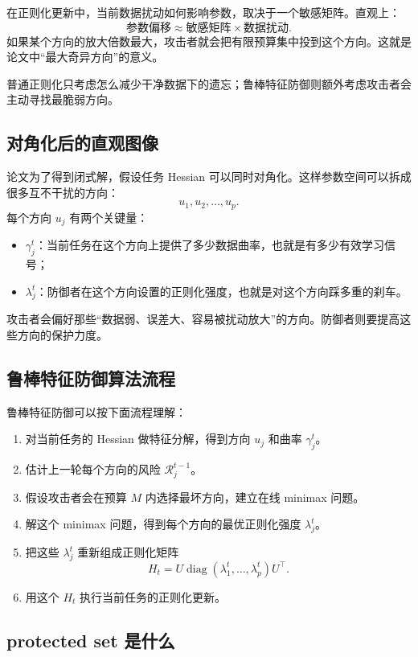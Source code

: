 \documentclass[UTF8,fontset=none,11pt]{ctexart}
\newcommand{\calR}{\mathcal{R}}
\newcommand{\diag}{\operatorname{diag}}
\begin{document}
在正则化更新中，当前数据扰动如何影响参数，取决于一个敏感矩阵。直观上：
\[
  \text{参数偏移}
  \approx
  \text{敏感矩阵}\times\text{数据扰动}.
\]
如果某个方向的放大倍数最大，攻击者就会把有限预算集中投到这个方向。这就是论文中“最大奇异方向”的意义。

普通正则化只考虑怎么减少干净数据下的遗忘；鲁棒特征防御则额外考虑攻击者会主动寻找最脆弱方向。

\subsection{对角化后的直观图像}

论文为了得到闭式解，假设任务 Hessian 可以同时对角化。这样参数空间可以拆成很多互不干扰的方向：
\[
  u_1,u_2,\dots,u_p.
\]
每个方向 \(u_j\) 有两个关键量：
\begin{itemize}
  \item \(\gamma_j^t\)：当前任务在这个方向上提供了多少数据曲率，也就是有多少有效学习信号；
  \item \(\lambda_j^t\)：防御者在这个方向设置的正则化强度，也就是对这个方向踩多重的刹车。
\end{itemize}

攻击者会偏好那些“数据弱、误差大、容易被扰动放大”的方向。防御者则要提高这些方向的保护力度。

\subsection{鲁棒特征防御算法流程}

鲁棒特征防御可以按下面流程理解：

\begin{enumerate}
  \item 对当前任务的 Hessian 做特征分解，得到方向 \(u_j\) 和曲率 \(\gamma_j^t\)。
  \item 估计上一轮每个方向的风险 \(\calR_j^{t-1}\)。
  \item 假设攻击者会在预算 \(M\) 内选择最坏方向，建立在线 minimax 问题。
  \item 解这个 minimax 问题，得到每个方向的最优正则化强度 \(\lambda_j^t\)。
  \item 把这些 \(\lambda_j^t\) 重新组成正则化矩阵
  \[
    H_t=U\diag(\lambda_1^t,\dots,\lambda_p^t)U^\top.
  \]
  \item 用这个 \(H_t\) 执行当前任务的正则化更新。
\end{enumerate}

\subsection{protected set 是什么}
\end{document}
